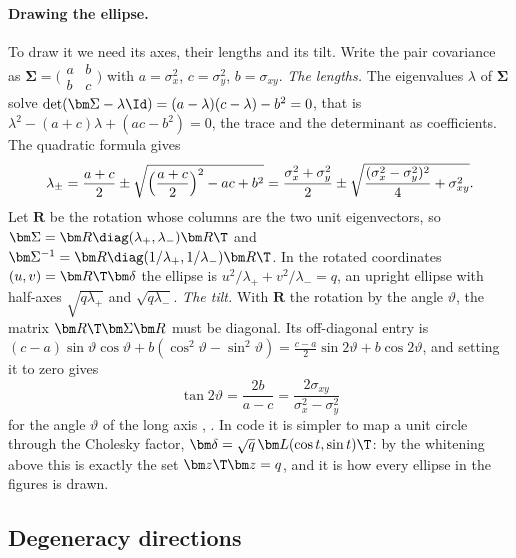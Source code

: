 \paragraph{Drawing the ellipse.} To draw it we need its axes, their lengths and its tilt. Write the pair
covariance as $\bm\Sigma=\bigl(\begin{smallmatrix}a&b\\ b&c\end{smallmatrix}\bigr)$ with $a=\sigma_x^2$, $c=\sigma_y^2$, $b=\sigma_{xy}$.
\emph{The lengths.} The eigenvalues $\lambda$ of $\bm\Sigma$ solve $\det(\bm\Sigma-\lambda\Id)=(a-\lambda)(c-\lambda)-b^2=0$, that is
$\lambda^2-(a+c)\lambda+(ac-b^2)=0$, the trace and the determinant as coefficients. The quadratic formula gives
\[
  \lambda_\pm=\frac{a+c}2\pm\sqrt{\Bigl(\frac{a+c}2\Bigr)^2-ac+b^2}
  =\frac{\sigma_x^2+\sigma_y^2}2\pm\sqrt{\frac{(\sigma_x^2-\sigma_y^2)^2}4+\sigma_{xy}^2}.
\]
Let $\bm R$ be the rotation whose columns are the two unit eigenvectors, so $\bm\Sigma=\bm R\diag(\lambda_+,\lambda_-)\bm R\T$ and
$\bm\Sigma^{-1}=\bm R\diag(1/\lambda_+,1/\lambda_-)\bm R\T$. In the rotated coordinates $(u,v)=\bm R\T\bm\delta$ the ellipse is
$u^2/\lambda_++v^2/\lambda_-=q$, an upright ellipse with half-axes $\sqrt{q\lambda_+}$ and $\sqrt{q\lambda_-}$.
\emph{The tilt.} With $\bm R$ the rotation by the angle $\vartheta$, the matrix $\bm R\T\bm\Sigma\bm R$ must be diagonal. Its
off-diagonal entry is $(c-a)\sin\vartheta\cos\vartheta+b(\cos^2\vartheta-\sin^2\vartheta)=\frac{c-a}2\sin2\vartheta+b\cos2\vartheta$, and
setting it to zero gives
\[
  \tan2\vartheta=\frac{2b}{a-c}=\frac{2\sigma_{xy}}{\sigma_x^2-\sigma_y^2}
\]
for the angle $\vartheta$ of the long axis \cite{Coe2009}, . In code it is simpler to map a
unit circle through the Cholesky factor, $\bm\delta=\sqrt q\,\bm L(\cos t,\sin t)\T$: by the whitening above this is
exactly the set $\bm z\T\bm z=q$, and it is how every ellipse in the figures is drawn.

\subsection{Degeneracy directions}
\label{10a:sec:degeneracy}

